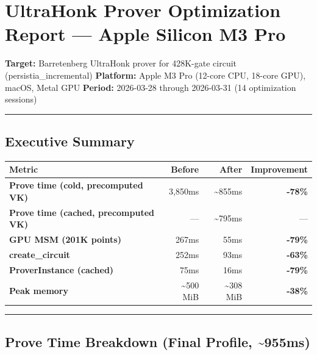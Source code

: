 \documentclass[
]{article}
\author{}
\date{}
\newcounter{none} %
\begin{document}
\section{UltraHonk Prover Optimization Report --- Apple Silicon M3
Pro}\label{ultrahonk-prover-optimization-report-apple-silicon-m3-pro}

\textbf{Target:} Barretenberg UltraHonk prover for 428K-gate circuit
(persistia\_incremental) \textbf{Platform:} Apple M3 Pro (12-core CPU,
18-core GPU), macOS, Metal GPU \textbf{Period:} 2026-03-28 through
2026-03-31 (14 optimization sessions)

\begin{center}\rule{0.5\linewidth}{0.5pt}\end{center}

\subsection{Executive Summary}\label{executive-summary}

{\def\LTcaptype{none} %
\begin{longtable}[]{@{}lrrr@{}}
\toprule\noalign{}
Metric & Before & After & Improvement \\
\midrule\noalign{}
\endhead
\bottomrule\noalign{}
\endlastfoot
\textbf{Prove time (cold, precomputed VK)} & 3,850ms &
\textasciitilde855ms & \textbf{-78\%} \\
\textbf{Prove time (cached, precomputed VK)} & --- &
\textasciitilde795ms & --- \\
\textbf{GPU MSM (201K points)} & 267ms & 55ms & \textbf{-79\%} \\
\textbf{create\_circuit} & 252ms & 93ms & \textbf{-63\%} \\
\textbf{ProverInstance (cached)} & 75ms & 16ms & \textbf{-79\%} \\
\textbf{Peak memory} & \textasciitilde500 MiB & \textasciitilde308 MiB &
\textbf{-38\%} \\
\end{longtable}
}

\begin{center}\rule{0.5\linewidth}{0.5pt}\end{center}

\subsection{Prove Time Breakdown (Final Profile,
\textasciitilde955ms)}\label{prove-time-breakdown-final-profile-955ms}
\end{document}
